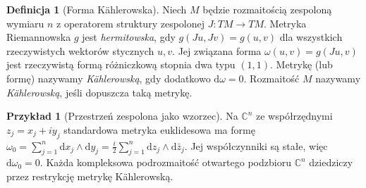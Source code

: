 \documentclass[11pt,a4paper,openany]{report}
\numberwithin{equation}{section}
\theoremstyle{plain}
\theoremstyle{definition}
\newtheorem{definicja}[twierdzenie]{Definicja}
\newtheorem{przyklad}[twierdzenie]{Przykład}
\theoremstyle{remark}
\newcommand{\C}{\mathbb C}
\begin{document}
\begin{definicja}[Forma Kählerowska]
Niech $M$ będzie rozmaitością zespoloną wymiaru $n$
z operatorem struktury zespolonej $J:TM\to TM$.
Metryka Riemannowska $g$ jest \emph{hermitowska}, gdy
$g(Ju,Jv)=g(u,v)$ dla wszystkich rzeczywistych
wektorów stycznych $u,v$. Jej związana forma
$\omega(u,v)=g(Ju,v)$ jest rzeczywistą formą różniczkową
stopnia dwa typu $(1,1)$. Metrykę (lub formę)
nazywamy \emph{Kählerowską}, gdy dodatkowo
$\mathrm d\omega=0$. Rozmaitość $M$ nazywamy
\emph{Kählerowską}, jeśli dopuszcza taką metrykę.
\end{definicja}

\begin{przyklad}[Przestrzeń zespolona jako wzorzec]
Na $\C^n$ ze współrzędnymi $z_j=x_j+iy_j$
standardowa metryka euklidesowa ma formę
$\omega_0=\sum_{j=1}^n\mathrm dx_j\wedge\mathrm dy_j
=\frac{i}{2}\sum_{j=1}^n\mathrm dz_j\wedge\mathrm d\bar z_j$.
Jej współczynniki są stałe, więc $\mathrm d\omega_0=0$.
Każda kompleksowa podrozmaitość otwartego podzbioru
$\C^n$ dziedziczy przez restrykcję metrykę Kählerowską.
\end{przyklad}
\end{document}
